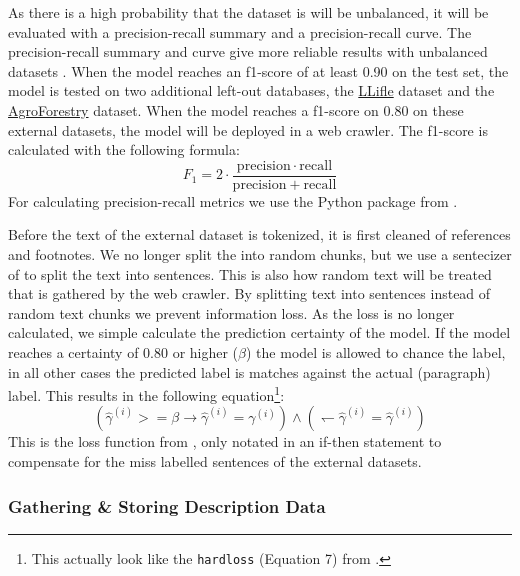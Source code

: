 \documentclass[a4paper, 12pt, oneside]{book} %
\begin{document}
As there is a high probability that the dataset is will be unbalanced, it will be evaluated with a precision-recall summary and a precision-recall curve.
The precision-recall summary and curve give more reliable results with unbalanced datasets \autocite{saito_precision-recall_2015}.
When the model reaches an f1-score of at least 0.90 on the test set, the model is tested on two additional left-out databases, the \href{http://www.llifle.com/}{LLifle} dataset and the \href{https://www.worldagroforestry.org/}{AgroForestry} dataset.
When the model reaches a f1-score on 0.80 on these external datasets, the model will be deployed in a web crawler.
The f1-score is calculated with the following formula:
\begin{equation}
    F_1 = 2 \cdot \frac{\mathrm{precision} \cdot \mathrm{recall}}{\mathrm{precision} + \mathrm{recall}} 
\end{equation}
For calculating precision-recall metrics we use the Python package from \textcite{pedregosa_scikit-learn_2011}.

Before the text of the external dataset is tokenized, it is first cleaned of references and footnotes.
We no longer split the into random chunks, but we use a sentecizer of \textcite{honnibal_spacy_2020} to split the text into sentences.
This is also how random text will be treated that is gathered by the web crawler.
By splitting text into sentences instead of random text chunks we prevent information loss.
As the loss is no longer calculated, we simple calculate the prediction certainty of the model.
If the model reaches a certainty of 0.80 or higher (\(\beta\)) the model is allowed to chance the label, in all other cases the predicted label is matches against the actual (paragraph) label.
This results in the following equation\footnote{This actually look like the \texttt{hardloss} (Equation 7) from \textcite{reed_training_2015}.}:
\begin{equation} \label{eq:softloss_ifthen}
(\hat{\gamma}^{(i)} >= \beta \rightarrow \hat{\gamma}^{(i)} = \gamma^{(i)}) \wedge ( \leftharpoondown \hat{\gamma}^{(i)} = \hat{\gamma}^{(i)})
\end{equation}
This is the loss function from \textcite{reed_training_2015}, only notated in an if-then statement to compensate for the miss labelled sentences of the external datasets.


\subsubsection{Gathering \& Storing Description Data}
\end{document}
